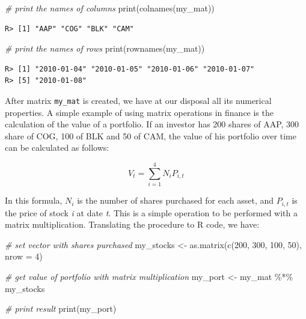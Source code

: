\documentclass[
  12pt,
]{book}
\newenvironment{Shaded}{\begin{snugshade}}{\end{snugshade}}
\newcommand{\AttributeTok}[1]{\textcolor[rgb]{0.61,0.61,0.61}{#1}}
\newcommand{\CommentTok}[1]{\textcolor[rgb]{0.37,0.37,0.37}{\textit{#1}}}
\newcommand{\DecValTok}[1]{\textcolor[rgb]{0.06,0.06,0.06}{#1}}
\newcommand{\FunctionTok}[1]{\textcolor[rgb]{0,0,0}{#1}}
\newcommand{\NormalTok}[1]{#1}
\newcommand{\OtherTok}[1]{\textcolor[rgb]{0.37,0.37,0.37}{#1}}
\newcommand{\SpecialCharTok}[1]{\textcolor[rgb]{0,0,0}{#1}}
\begin{document}
\begin{Shaded}
\begin{Highlighting}[]
\CommentTok{\# print the names of columns }
\FunctionTok{print}\NormalTok{(}\FunctionTok{colnames}\NormalTok{(my\_mat))}
\end{Highlighting}
\end{Shaded}

\begin{verbatim}
R> [1] "AAP" "COG" "BLK" "CAM"
\end{verbatim}

\begin{Shaded}
\begin{Highlighting}[]
\CommentTok{\# print the names of rows}
\FunctionTok{print}\NormalTok{(}\FunctionTok{rownames}\NormalTok{(my\_mat))}
\end{Highlighting}
\end{Shaded}

\begin{verbatim}
R> [1] "2010-01-04" "2010-01-05" "2010-01-06" "2010-01-07"
R> [5] "2010-01-08"
\end{verbatim}

After matrix \texttt{my\_mat} is created, we have at our disposal all its numerical properties. A simple example of using matrix operations in finance is the calculation of the value of a portfolio. If an investor has 200 shares of AAP, 300 share of COG, 100 of BLK and 50 of CAM, the value of his portfolio over time can be calculated as follows:

\[V _t = \sum _{i=1} ^{4} N _i P_{i,t}\]

In this formula, \(N_i\) is the number of shares purchased for each asset, and \(P_{i,t}\) is the price of stock \emph{i} at date \emph{t}. This is a simple operation to be performed with a matrix multiplication. Translating the procedure to R code, we have:

\begin{Shaded}
\begin{Highlighting}[]
\CommentTok{\# set vector with shares purchased}
\NormalTok{my\_stocks }\OtherTok{\textless{}{-}} \FunctionTok{as.matrix}\NormalTok{(}\FunctionTok{c}\NormalTok{(}\DecValTok{200}\NormalTok{, }\DecValTok{300}\NormalTok{, }\DecValTok{100}\NormalTok{, }\DecValTok{50}\NormalTok{), }\AttributeTok{nrow =} \DecValTok{4}\NormalTok{)}

\CommentTok{\# get value of portfolio with matrix multiplication}
\NormalTok{my\_port }\OtherTok{\textless{}{-}}\NormalTok{ my\_mat }\SpecialCharTok{\%*\%}\NormalTok{ my\_stocks}

\CommentTok{\# print result}
\FunctionTok{print}\NormalTok{(my\_port)}
\end{Highlighting}
\end{Shaded}
\end{document}
